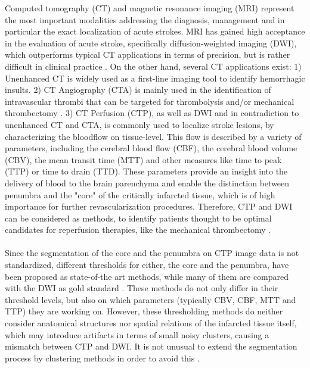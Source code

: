 \documentclass{article}%
\begin{document}
\begin{center}
Computed tomography (CT) and magnetic resonance imaging (MRI) represent the most important modalities addressing the diagnosis, management and in particular the exact localization of acute strokes. MRI has gained high acceptance in the evaluation of acute stroke, specifically diffusion-weighted imaging (DWI), which outperforms typical CT applications in terms of precision, but is rather difficult in clinical practice \cite{schaefer2002diffusion, lansberg2000comparison}. On the other hand, several CT applications exist: 1) Unenhanced CT is widely used as a first-line imaging tool to identify hemorrhagic insults. 2) CT Angiography (CTA) is mainly used in the identification of  intravascular thrombi that can be targeted for thrombolysis and/or mechanical thrombectomy \cite{torbey2013stroke, gonzalez2011acute}. 3) CT Perfusion (CTP), as well as DWI and in contradiction to unenhanced CT and CTA, is commonly used to localize stroke lesions, by characterizing the bloodflow on tissue-level. This flow is described by a variety of parameters, including the cerebral blood flow (CBF), the cerebral blood volume (CBV), the mean transit time (MTT) and other measures like time to peak (TTP) or time to drain (TTD). These parameters provide an insight into the delivery of blood to the brain parenchyma and enable the distinction between penumbra and the "core" of the critically infarcted tissue, which is of high importance for further revascularization procedures. Therefore, CTP and DWI can be considered as methods, to identify patients thought to be optimal candidates for reperfusion therapies, like the mechanical thrombectomy \cite{gonzalez2011acute, lin2016imaging, torbey2013stroke}. \\\\

Since the segmentation of the core and the penumbra on CTP image data is not standardized, different thresholds for either, the core and the penumbra, have been proposed as state-of-the art methods, while many of them are compared with the DWI as gold standard \cite{wintermark2007comparison, wintermark2006perfusion, schaefer2008quantitative, soares2010reperfusion, campbell2011cerebral}. These methods do not only differ in their threshold levels, but also on which parameters (typically CBV, CBF, MTT and TTP) they are working on. However, these thresholding methods do neither consider anatomical structures nor spatial relations of the infarcted tissue itself, which may introduce artifacts in terms of small noisy clusters, causing a mismatch between CTP and DWI. It is not unusual to extend the segmentation process by clustering methods in order to avoid this \cite{bivard2011defining, bivard2013perfusion}. \\\\


\end{center}
\end{document}
